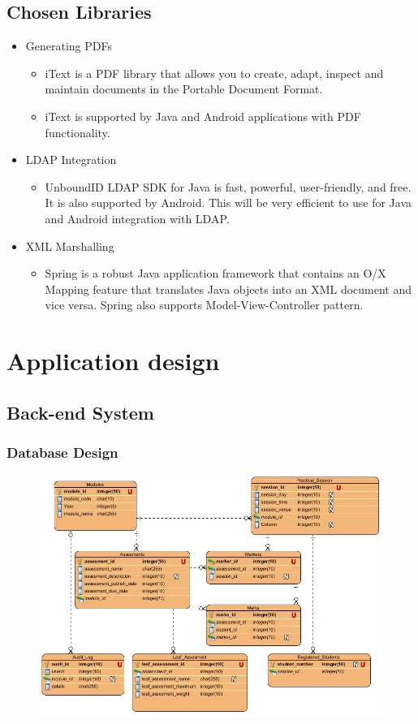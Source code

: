 \documentclass[12pt,a4paper]{article}
\begin{document}
\subsection{Chosen Libraries}
\begin{itemize}
	\item Generating PDFs
		\begin{itemize}
			\item iText is a PDF library that allows you to create, adapt, inspect and maintain documents in the Portable Document Format.
			\item iText is supported by Java and Android applications with PDF functionality.
		\end{itemize}
	\item LDAP Integration
		\begin{itemize}
			\item UnboundID LDAP SDK for Java is fast, powerful, user-friendly, and free. It is also supported by Android. This will be very efficient to use for Java and Android integration with LDAP.
		\end{itemize}
	\item XML Marshalling
		\begin{itemize}
			\item Spring is a robust Java application framework that contains an O/X Mapping feature that translates Java objects into an XML document and vice versa. Spring also supports Model-View-Controller pattern.
		\end{itemize}
\end{itemize}
\pagebreak
\section{Application design}
\subsection{Back-end System}
		\subsubsection{Database Design}
		\begin{figure}[ht!]
							\centering
							\includegraphics[scale=0.8]{./DatabaseDiagram/Backend_Database.jpg}
						\end{figure}
\end{document}
